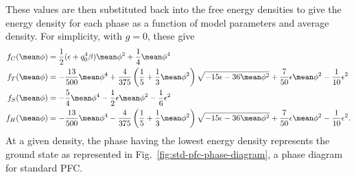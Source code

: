 These values are then substituted back into the free energy densities to give the energy density for each phase as a function of model parameters and average density.  For simplicity, with $g=0$, these give
\begin{subequations}
\begin{align}
f_C(\mean\phi) &= \frac{1}{2}(\epsilon + q_0^4 \beta) \mean\phi^2 + \frac{1}{4}\mean\phi^4 \\
f_T(\mean\phi) &= - \frac{13}{500} \mean\phi^4 + \frac{4}{375} \left( \frac{1}{5} + \frac{1}{3} \mean\phi^2 \right) \sqrt{-15 \epsilon - 36 \mean\phi^2} + \frac{7}{50} \epsilon \mean\phi^2 - \frac{1}{10} \epsilon^2 \\
f_S(\mean\phi) &= - \frac{5}{4} \mean\phi^4 - \frac{1}{2} \epsilon \mean\phi^2 - \frac{1}{6} \epsilon^2  \\
f_H(\mean\phi) &= - \frac{13}{500} \mean\phi^4 - \frac{4}{375} \left( \frac{1}{5} + \frac{1}{3} \mean\phi^2 \right) \sqrt{-15 \epsilon - 36 \mean\phi^2} + \frac{7}{50} \epsilon \mean\phi^2 - \frac{1}{10} \epsilon^2. \\
\end{align}
\end{subequations}
%
At a given density, the phase having the lowest energy density represents the ground state as represented in Fig.~\ref{fig:std-pfc-phase-diagram}, a phase diagram for standard PFC.

